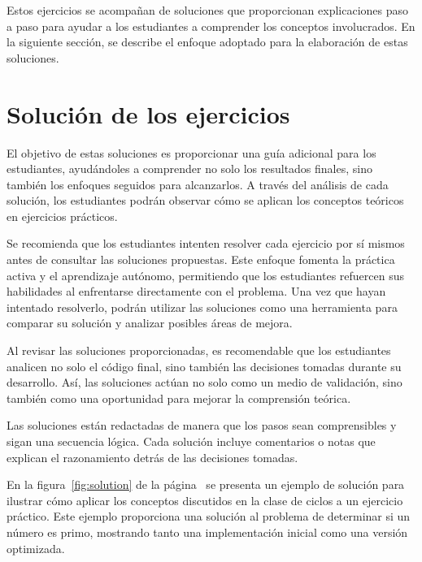 \documentclass{article}
\begin{document}
Estos ejercicios se acompañan de soluciones que proporcionan explicaciones paso a paso para ayudar a los estudiantes a comprender los conceptos involucrados. En la siguiente sección, se describe el enfoque adoptado para la elaboración de estas soluciones.

\section{Solución de los ejercicios}

El objetivo de estas soluciones es proporcionar una guía adicional para los estudiantes, ayudándoles a comprender no solo los resultados finales, sino también los enfoques seguidos para alcanzarlos. A través del análisis de cada solución, los estudiantes podrán observar cómo se aplican los conceptos teóricos en ejercicios prácticos.

Se recomienda que los estudiantes intenten resolver cada ejercicio por sí mismos antes de consultar las soluciones propuestas. Este enfoque fomenta la práctica activa y el aprendizaje autónomo, permitiendo que los estudiantes refuercen sus habilidades al enfrentarse directamente con el problema. Una vez que hayan intentado resolverlo, podrán utilizar las soluciones como una herramienta para comparar su solución y analizar posibles áreas de mejora.

Al revisar las soluciones proporcionadas, es recomendable que los estudiantes analicen no solo el código final, sino también las decisiones tomadas durante su desarrollo. Así, las soluciones actúan no solo como un medio de validación, sino también como una oportunidad para mejorar la comprensión teórica.

Las soluciones están redactadas de manera que los pasos sean comprensibles y sigan una secuencia lógica. Cada solución incluye comentarios o notas que explican el razonamiento detrás de las decisiones tomadas.

En la figura~\ref{fig:solution} de la página~\pageref{fig:solution} se presenta un ejemplo de solución para ilustrar cómo aplicar los conceptos discutidos en la clase de ciclos a un ejercicio práctico. Este ejemplo proporciona una solución al problema de determinar si un número es primo, mostrando tanto una implementación inicial como una versión optimizada.
\end{document}
